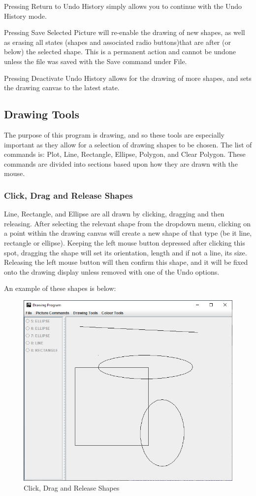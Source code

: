 \documentclass[12pt]{article} %
\begin{document}
Pressing Return to Undo History simply allows you to continue with the Undo History mode.

Pressing Save Selected Picture will re-enable the drawing of new shapes, as well as erasing all states (shapes and associated radio buttons)that are after (or below) the selected shape. This is a permanent action and cannot be undone unless the file was saved with the Save command under File.

Pressing Deactivate Undo History allows for the drawing of more shapes, and sets the drawing canvas to the latest state. 

\subsection{Drawing Tools}
The purpose of this program is drawing, and so these tools are especially important as they allow for a selection of drawing shapes to be chosen. The list of commands is: Plot, Line, Rectangle, Ellipse, Polygon, and Clear Polygon. These commands are divided into sections based upon how they are drawn with the mouse.

\subsubsection{Click, Drag and Release Shapes} 
Line, Rectangle, and Ellipse are all drawn by clicking, dragging and then releasing. After selecting the relevant shape from the dropdown menu, clicking on a point within the drawing canvas will create a new shape of that type (be it line, rectangle or ellipse). Keeping the left mouse button depressed after clicking this spot, dragging the shape will set its orientation, length and if not a line, its size. Releasing the left mouse button will then confirm this shape, and it will be fixed onto the drawing display unless removed with one of the Undo options.

An example of these shapes is below:
\begin{figure}[H]
\caption{Click, Drag and Release Shapes}
\centering
\includegraphics[scale=0.75]{pictures/clickdragreleaseFirstWindow.PNG}
\end{figure}
\end{document}
